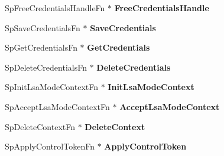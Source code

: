 \begin{DoxyCompactItemize}
\item 
\mbox{\label{struct_s_e_c_p_k_g___f_u_n_c_t_i_o_n___t_a_b_l_e_a41140f886ffe65d37160c0d74cc5243f}} 
Sp\+Free\+Credentials\+Handle\+Fn $\ast$ {\bfseries Free\+Credentials\+Handle}
\item 
\mbox{\label{struct_s_e_c_p_k_g___f_u_n_c_t_i_o_n___t_a_b_l_e_a42c21aa3951c0356ef218c8a87f1ea2f}} 
Sp\+Save\+Credentials\+Fn $\ast$ {\bfseries Save\+Credentials}
\item 
\mbox{\label{struct_s_e_c_p_k_g___f_u_n_c_t_i_o_n___t_a_b_l_e_a28eab30317283b9468167763b61a0fcb}} 
Sp\+Get\+Credentials\+Fn $\ast$ {\bfseries Get\+Credentials}
\item 
\mbox{\label{struct_s_e_c_p_k_g___f_u_n_c_t_i_o_n___t_a_b_l_e_a00e1e7a7fda4ecc13e00751de89010b9}} 
Sp\+Delete\+Credentials\+Fn $\ast$ {\bfseries Delete\+Credentials}
\item 
\mbox{\label{struct_s_e_c_p_k_g___f_u_n_c_t_i_o_n___t_a_b_l_e_a99e89b69fe039cc4328ea03e604f42a3}} 
Sp\+Init\+Lsa\+Mode\+Context\+Fn $\ast$ {\bfseries Init\+Lsa\+Mode\+Context}
\item 
\mbox{\label{struct_s_e_c_p_k_g___f_u_n_c_t_i_o_n___t_a_b_l_e_ab02e05ddaa941bb45caa8fe81322343a}} 
Sp\+Accept\+Lsa\+Mode\+Context\+Fn $\ast$ {\bfseries Accept\+Lsa\+Mode\+Context}
\item 
\mbox{\label{struct_s_e_c_p_k_g___f_u_n_c_t_i_o_n___t_a_b_l_e_af75c1c5a33068aa60f49518c22c3caba}} 
Sp\+Delete\+Context\+Fn $\ast$ {\bfseries Delete\+Context}
\item 
\mbox{\label{struct_s_e_c_p_k_g___f_u_n_c_t_i_o_n___t_a_b_l_e_a630f6631e6a38ea4b4d3191fd7145192}} 
Sp\+Apply\+Control\+Token\+Fn $\ast$ {\bfseries Apply\+Control\+Token}
\item 
\mbox{\label{struct_s_e_c_p_k_g___f_u_n_c_t_i_o_n___t_a_b_l_e_a75aa522880b27e59576d1294d4ebc1a8}} 

\end{DoxyCompactItemize}
